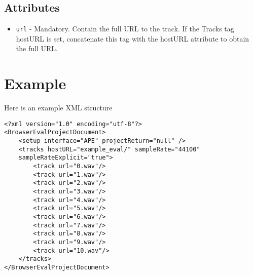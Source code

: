 \documentclass{article}
\begin{document}
\subsection{Attributes}
\begin{itemize}
\item \texttt{url} - Mandatory. Contain the full URL to the track. If the Tracks tag hostURL is set, concatenate this tag with the hostURL attribute to obtain the full URL.
\end{itemize}

\section{Example}

Here is an example XML structure

\begin{lstlisting}
<?xml version="1.0" encoding="utf-8"?>
<BrowserEvalProjectDocument>
	<setup interface="APE" projectReturn="null" />
	<tracks hostURL="example_eval/" sampleRate="44100"
	sampleRateExplicit="true">
		<track url="0.wav"/>
		<track url="1.wav"/>
		<track url="2.wav"/>
		<track url="3.wav"/>
		<track url="4.wav"/>
		<track url="5.wav"/>
		<track url="6.wav"/>
		<track url="7.wav"/>
		<track url="8.wav"/>
		<track url="9.wav"/>
		<track url="10.wav"/>
	</tracks>
</BrowserEvalProjectDocument>
\end{lstlisting}
\end{document}
